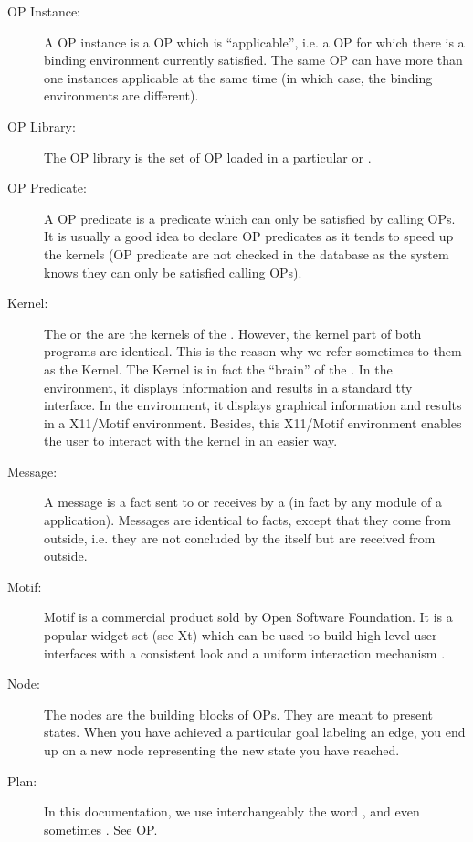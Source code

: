 \begin{description}
\item[OP Instance:] A OP instance is a OP which is ``applicable'', i.e. a OP
for which there is a binding environment currently satisfied. The same OP can
have more than one instances applicable at the same time (in which case, the
binding environments are different).

\item[OP Library:] The OP library is the set of OP loaded in a particular \CPK{}
or \XPK{}.

\item[OP Predicate:] A OP predicate is a predicate which can only be satisfied
by calling OPs. It is usually a good idea to declare OP predicates as it tends
to speed up the kernels (OP predicate are not checked in the database as the
system knows they can only be satisfied calling OPs).

\item[Kernel:] The \CPK{} or the \XPK{} are the kernels of the \COPRSDE{}.
However, the kernel part of both programs are identical. This is the reason why
we refer sometimes to them as the Kernel. The Kernel is in fact the ``brain''
of the \COPRSDE{}. In the \CPK{} environment, it displays information and
results in a standard tty interface. In the \XPK{} environment, it displays
graphical information and results in a X11/Motif environment. Besides, this
X11/Motif environment enables the user to interact with the kernel in an easier
way.

\item[Message:] A message is a fact sent to or receives by a \PK{} (in fact by
any module of a \COPRS{} application). Messages are identical to facts, except
that they come from outside, i.e. they are not concluded by the \PK{} itself
but are received from outside.

\item[Motif:] Motif is a commercial product sold by Open Software
Foundation. It is a popular widget set (see Xt) which can be used to
build high level user interfaces with a consistent look and a uniform
interaction mechanism \cite{Motif-manual}.

\item[Node:] The nodes are the building blocks of OPs. They are meant to
present states. When you have achieved a particular goal labeling an edge, you
end up on a new node representing the new state you have reached. 

\item[Plan:] In this documentation, we use interchangeably the
word ,  and even sometimes . See OP.


\end{description}
